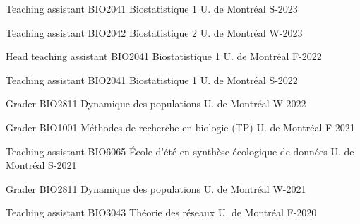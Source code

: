 


\begin{cvhonors}

  \cvhonor
    {Teaching assistant} %
    {BIO2041 Biostatistique 1} %
    {U. de Montréal} %
    {S-2023} %

  \cvhonor
    {Teaching assistant} %
    {BIO2042 Biostatistique 2} %
    {U. de Montréal} %
    {W-2023} %
    
  \cvhonor
    {Head teaching assistant} %
    {BIO2041 Biostatistique 1} %
    {U. de Montréal} %
    {F-2022} %

  \cvhonor
    {Teaching assistant} %
    {BIO2041 Biostatistique 1} %
    {U. de Montréal} %
    {S-2022} %

  \cvhonor
    {Grader} %
    {BIO2811 Dynamique des populations} %
    {U. de Montréal} %
    {W-2022} %

  \cvhonor
    {Grader} %
    {BIO1001 Méthodes de recherche en biologie (TP)} %
    {U. de Montréal} %
    {F-2021} %

  \cvhonor
    {Teaching assistant} %
    {BIO6065 École d’été en synthèse écologique de données} %
    {U. de Montréal} %
    {S-2021} %
    
  \cvhonor
    {Grader} %
    {BIO2811 Dynamique des populations} %
    {U. de Montréal} %
    {W-2021} %

  \cvhonor
    {Teaching assistant} %
    {BIO3043 Théorie des réseaux} %
    {U. de Montréal} %
    {F-2020} %
    
\end{cvhonors}


